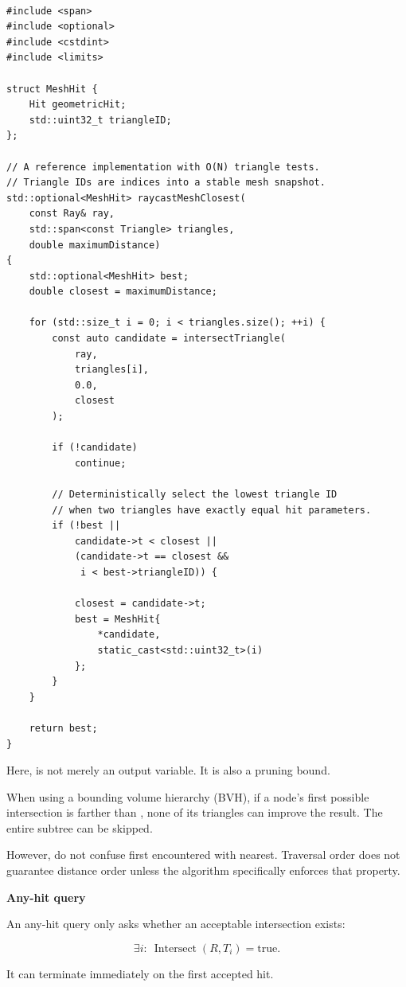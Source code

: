 \begin{verbatim}

#include <span>
#include <optional>
#include <cstdint>
#include <limits>

struct MeshHit {
    Hit geometricHit;
    std::uint32_t triangleID;
};

// A reference implementation with O(N) triangle tests.
// Triangle IDs are indices into a stable mesh snapshot.
std::optional<MeshHit> raycastMeshClosest(
    const Ray& ray,
    std::span<const Triangle> triangles,
    double maximumDistance)
{
    std::optional<MeshHit> best;
    double closest = maximumDistance;

    for (std::size_t i = 0; i < triangles.size(); ++i) {
        const auto candidate = intersectTriangle(
            ray,
            triangles[i],
            0.0,
            closest
        );

        if (!candidate)
            continue;

        // Deterministically select the lowest triangle ID
        // when two triangles have exactly equal hit parameters.
        if (!best ||
            candidate->t < closest ||
            (candidate->t == closest &&
             i < best->triangleID)) {

            closest = candidate->t;
            best = MeshHit{
                *candidate,
                static_cast<std::uint32_t>(i)
            };
        }
    }

    return best;
}
\end{verbatim}

Here,  is not merely an output variable. It is also a pruning bound.

When using a bounding volume hierarchy (BVH), if a node's first possible intersection is farther than , none of its triangles can improve the result. The entire subtree can be skipped.

However, do not confuse first encountered with nearest. Traversal order does not guarantee distance order unless the algorithm specifically enforces that property.

\textbf{Any-hit query}

An any-hit query only asks whether an acceptable intersection exists:

\[
\exists i:\ \operatorname{Intersect}(R,T_i)=\text{true}.
\]

It can terminate immediately on the first accepted hit.

